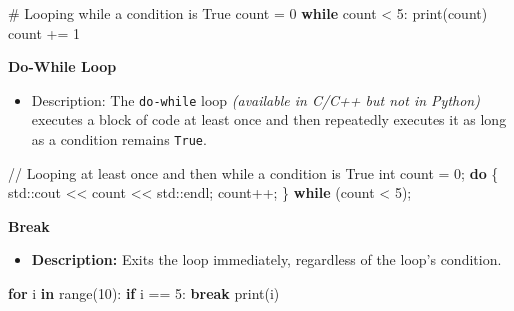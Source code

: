 \documentclass[
  letterpaper,
  DIV=11,
  numbers=noendperiod]{scrreprt}
\newenvironment{Shaded}{\begin{snugshade}}{\end{snugshade}}
\newcommand{\BuiltInTok}[1]{\textcolor[rgb]{0.00,0.23,0.31}{#1}}
\newcommand{\CommentTok}[1]{\textcolor[rgb]{0.37,0.37,0.37}{#1}}
\newcommand{\ControlFlowTok}[1]{\textcolor[rgb]{0.00,0.23,0.31}{\textbf{#1}}}
\newcommand{\DataTypeTok}[1]{\textcolor[rgb]{0.68,0.00,0.00}{#1}}
\newcommand{\DecValTok}[1]{\textcolor[rgb]{0.68,0.00,0.00}{#1}}
\newcommand{\KeywordTok}[1]{\textcolor[rgb]{0.00,0.23,0.31}{\textbf{#1}}}
\newcommand{\NormalTok}[1]{\textcolor[rgb]{0.00,0.23,0.31}{#1}}
\newcommand{\OperatorTok}[1]{\textcolor[rgb]{0.37,0.37,0.37}{#1}}
\providecommand{\tightlist}{%
  \setlength{\itemsep}{0pt}\setlength{\parskip}{0pt}}
\begin{document}
\begin{tcolorbox}[enhanced jigsaw, colframe=quarto-callout-note-color-frame, toprule=.15mm, bottomrule=.15mm, rightrule=.15mm, colback=white, breakable, arc=.35mm, opacityback=0, left=2mm, leftrule=.75mm]
\begin{Shaded}
\begin{Highlighting}[]
\CommentTok{\# Looping while a condition is True}
\NormalTok{count }\OperatorTok{=} \DecValTok{0}
\ControlFlowTok{while}\NormalTok{ count }\OperatorTok{\textless{}} \DecValTok{5}\NormalTok{:}
    \BuiltInTok{print}\NormalTok{(count)}
\NormalTok{    count }\OperatorTok{+=} \DecValTok{1}
\end{Highlighting}
\end{Shaded}

\textbf{Do-While Loop}

\begin{itemize}
\tightlist
\item
  Description: The \texttt{do-while} loop \emph{(available in C/C++ but
  not in Python)} executes a block of code at least once and then
  repeatedly executes it as long as a condition remains \texttt{True}.
\end{itemize}

\begin{Shaded}
\begin{Highlighting}[]
\CommentTok{// Looping at least once and then while a condition is True}
\DataTypeTok{int}\NormalTok{ count }\OperatorTok{=} \DecValTok{0}\OperatorTok{;}
\ControlFlowTok{do} \OperatorTok{\{}
\NormalTok{    std}\OperatorTok{::}\NormalTok{cout }\OperatorTok{\textless{}\textless{}}\NormalTok{ count }\OperatorTok{\textless{}\textless{}}\NormalTok{ std}\OperatorTok{::}\NormalTok{endl}\OperatorTok{;}
\NormalTok{    count}\OperatorTok{++;}
\OperatorTok{\}} \ControlFlowTok{while} \OperatorTok{(}\NormalTok{count }\OperatorTok{\textless{}} \DecValTok{5}\OperatorTok{);}
\end{Highlighting}
\end{Shaded}

\textbf{Break}

\begin{itemize}
\tightlist
\item
  \textbf{Description:} Exits the loop immediately, regardless of the
  loop's condition.
\end{itemize}

\begin{Shaded}
\begin{Highlighting}[]
\ControlFlowTok{for}\NormalTok{ i }\KeywordTok{in} \BuiltInTok{range}\NormalTok{(}\DecValTok{10}\NormalTok{):}
    \ControlFlowTok{if}\NormalTok{ i }\OperatorTok{==} \DecValTok{5}\NormalTok{:}
        \ControlFlowTok{break}
    \BuiltInTok{print}\NormalTok{(i)}
\end{Highlighting}
\end{Shaded}


\end{tcolorbox}
\end{document}
